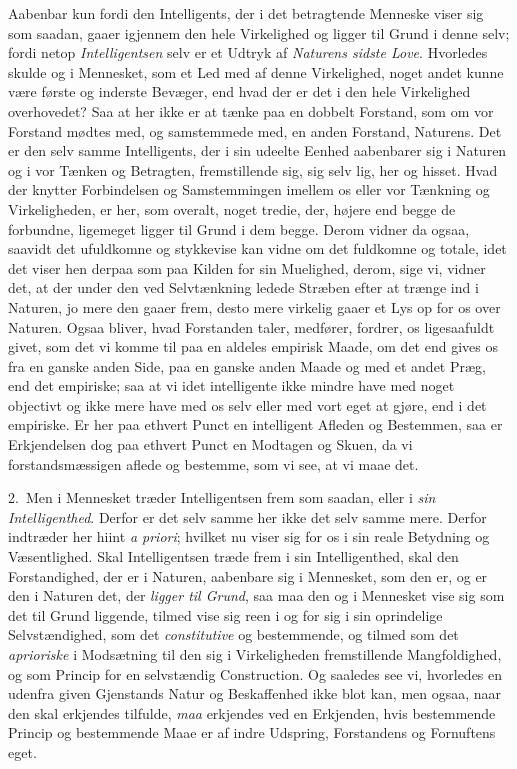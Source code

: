 \documentclass[12pt,a4paper]{book}
\newcommand{\apage}[1]{\marginnote{\footnotesize\textit{[#1]}}}
\begin{document}
Aabenbar kun fordi den Intelligents, der i det betragtende Menneske viser sig
som saadan, gaaer igjennem den hele Virkelighed og ligger til Grund i denne selv;
fordi netop \emph{Intelligentsen} selv er et Udtryk af \emph{Naturens sidste
Love}. Hvorledes skulde og i Mennesket, som et Led med af denne Virkelighed,
noget andet kunne være første og inderste Bevæger, end hvad der er det i den hele
Virkelighed overhovedet? Saa at her ikke er at tænke paa en dobbelt Forstand,
som om vor Forstand mødtes med, og samstemmede med, en anden Forstand, Naturens.
Det er den selv samme Intelligents, der i sin udeelte Eenhed aabenbarer sig i
Naturen og i vor Tænken og Betragten, fremstillende sig, sig selv \apage{66}  lig, her og
hisset. Hvad der knytter Forbindelsen og Samstemmingen imellem os eller vor
Tænkning og Virkeligheden, er her, som overalt, noget tredie, der, højere end
begge de forbundne, ligemeget ligger til Grund i dem begge. Derom vidner da
ogsaa, saavidt det ufuldkomne og stykkevise kan vidne om det fuldkomne og totale,
idet det viser hen derpaa som paa Kilden for sin Muelighed, derom, sige vi,
vidner det, at der under den ved Selvtænkning ledede Stræben efter at trænge ind
i Naturen, jo mere den gaaer frem, desto mere virkelig gaaer et Lys op for os
over Naturen. Ogsaa bliver, hvad Forstanden taler, medfører, fordrer, os
ligesaafuldt givet, som det vi komme til paa en aldeles empirisk Maade, om det
end gives os fra en ganske anden Side, paa en ganske anden Maade og med et andet
Præg, end det empiriske; saa at vi idet intelligente ikke mindre have med noget
objectivt og ikke mere have med os selv eller med vort eget at gjøre, end i det
empiriske. Er her paa ethvert Punct en intelligent Afleden og Bestemmen, saa er
Erkjendelsen dog paa ethvert Punct en Modtagen og Skuen, da vi forstandsmæssigen
aflede og bestemme, som vi see, at vi maae det.

2.~Men i Mennesket træder Intelligentsen frem som saadan, eller i \emph{sin
Intelligenthed}. Derfor er det selv samme her ikke det selv samme mere. Derfor
indtræder her hiint \emph{a priori};  \apage{67} hvilket nu viser sig for os i sin reale
Betydning og Væsentlighed. Skal Intelligentsen træde frem i sin Intelligenthed,
skal den Forstandighed, der er i Naturen, aabenbare sig i Mennesket, som den er,
og er den i Naturen det, der \emph{ligger til Grund}, saa maa den og i Mennesket
vise sig som det til Grund liggende, tilmed vise sig reen i og for sig i sin
oprindelige Selvstændighed, som det \emph{constitutive} og bestemmende, og tilmed
som det \emph{aprioriske} i Modsætning til den sig i Virkeligheden fremstillende
Mangfoldighed, og som Princip for en selvstændig Construction. Og saaledes see
vi, hvorledes en udenfra given Gjenstands Natur og Beskaffenhed ikke blot kan,
men ogsaa, naar den skal erkjendes tilfulde, \emph{maa} erkjendes ved en Erkjenden,
hvis bestemmende Princip og bestemmende Maae er af indre Udspring, Forstandens og
Fornuftens eget.
\end{document}
